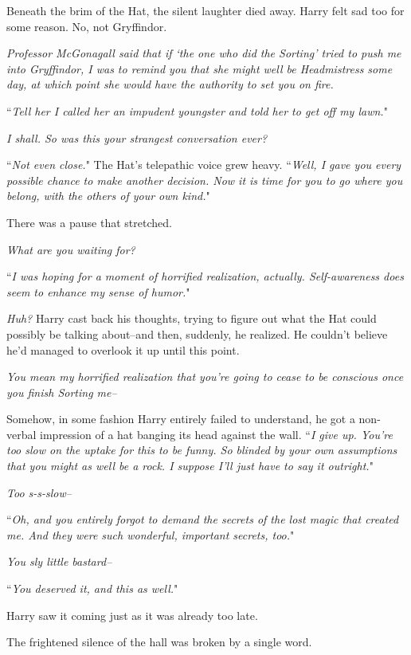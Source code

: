 Beneath the brim of the Hat, the silent laughter died away. Harry felt sad too for some reason. No, not Gryffindor.

\emph{Professor McGonagall said that if `the one who did the Sorting' tried to push me into Gryffindor, I was to remind you that she might well be Headmistress some day, at which point she would have the authority to set you on fire.}

``\emph{Tell her I called her an impudent youngster and told her to get off my lawn.}"

\emph{I shall. So was this your strangest conversation ever?}

``\emph{Not even close.}" The Hat's telepathic voice grew heavy. ``\emph{Well, I gave you every possible chance to make another decision. Now it is time for you to go where you belong, with the others of your own kind.}"

There was a pause that stretched.

\emph{What are you waiting for?}

``\emph{I was hoping for a moment of horrified realization, actually. Self-awareness does seem to enhance my sense of humor.}"

\emph{Huh?} Harry cast back his thoughts, trying to figure out what the Hat could possibly be talking about\---and then, suddenly, he realized. He couldn't believe he'd managed to overlook it up until this point.

\emph{You mean my horrified realization that you're going to cease to be conscious once you finish Sorting me\---}

Somehow, in some fashion Harry entirely failed to understand, he got a non-verbal impression of a hat banging its head against the wall. ``\emph{I give up. You're too slow on the uptake for this to be funny. So blinded by your own assumptions that you might as well be a rock. I suppose I'll just have to say it outright.}"

\emph{Too s-s-slow\---}

``\emph{Oh, and you entirely forgot to demand the secrets of the lost magic that created me. And they were such wonderful, important secrets, too.}"

\emph{You sly little \emph{bastard}\---}

``\emph{You deserved it, and this as well.}"

Harry saw it coming just as it was already too late.

The frightened silence of the hall was broken by a single word.

